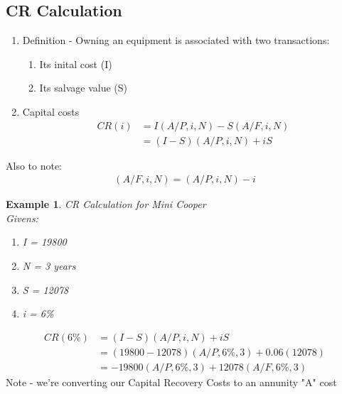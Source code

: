 \documentclass{report} %
\newtheorem{exmp}{Example}
\begin{document}
\subsection*{CR Calculation}
\begin{enumerate}
    \item Definition - Owning an equipment is associated with two transactions:
        \begin{enumerate}
            \item Its inital cost (I)
            \item Its salvage value (S)
        \end{enumerate}
    \item Capital costs
        \begin{equation*}
            \begin{aligned}
                CR(i) &= I(A/P,i,N)-S(A/F,i,N) \\
                        &= (I-S)(A/P,i,N) + iS 
            \end{aligned}
        \end{equation*}
\end{enumerate}
Also to note:
\begin{equation*}
    \begin{aligned}
        (A/F,i,N) = (A/P,i,N)-i
    \end{aligned}
\end{equation*}
\begin{exmp}
    CR Calculation for Mini Cooper \\
    Givens:
    \begin{enumerate}
        \item I = 19800
        \item N = 3 years
        \item S = 12078
        \item i = 6\%
    \end{enumerate}
\end{exmp}
\begin{equation*}
    \begin{aligned}
        CR(6\%) &= (I-S)(A/P,i,N) + iS \\
                &= (19800-12078)(A/P,6\%,3) + 0.06(12078) \\
                &= -19800(A/P,6\%,3) + 12078(A/F,6\%,3) 
    \end{aligned}
\end{equation*}
Note - we're converting our Capital Recovery Costs to an annunity "A" cost
\newline
{
}
\end{document}
